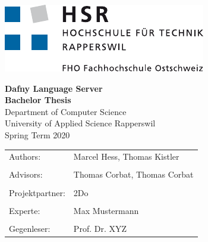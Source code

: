 \begin{titlepage}
\thispagestyle{empty}

\newcommand\thesisAuthors{Marcel Hess, Thomas Kistler}
\newcommand\thesisTitle{Dafny Language Server}
\newcommand\thesisSubject{Bachelor Thesis}
\newcommand\thesisUniversity{University of Applied Science Rapperswil}
\newcommand\thesisDepartment{Department of Computer Science}
\newcommand\thesisAdvisors{Thomas Corbat, Thomas Corbat}
\newcommand\thesisPartner{2Do}
\newcommand\thesisPeriod{Spring Term 2020}
\newcommand\thesisExpert{Max Mustermann}
\newcommand\thesisReader{Prof. Dr. XYZ}

    \includegraphics[height=0.08\textheight]{images/logo_hsr.pdf}\\[20mm]

    \begin{center}

    	\Huge
    	\textbf{\thesisTitle} \\
    	\textbf{\thesisSubject} \\[10mm]

    	\LARGE
    	\thesisDepartment\\
    	\thesisUniversity\\[10mm]

    	\thesisPeriod \\[15mm]

    	\vfill

    \end{center}

\begin{tabularx}{\textwidth}{l X}
			\large Authors: & \large{ \thesisAuthors} \tabularnewline
			\tabularnewline
			\large Advisors: & \large{\thesisAdvisors} \tabularnewline
			\tabularnewline
			\large Projektpartner: & \large \thesisPartner \tabularnewline
			 \tabularnewline
			\large Experte: & \large \thesisExpert \tabularnewline
			\tabularnewline
			\large Gegenleser: & \large \thesisReader
		\end{tabularx}

\end{titlepage}
